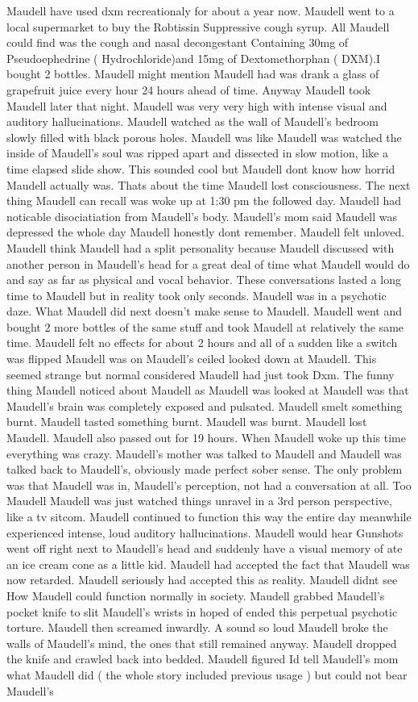 \documentclass[12pt]{book}
\begin{document}
Maudell have used dxm recreationaly for about a year now. Maudell went to a local supermarket to buy the Robtissin Suppressive cough syrup. All Maudell could find was the cough and nasal decongestant Containing 30mg of Pseudoephedrine ( Hydrochloride)and 15mg of Dextomethorphan ( DXM).I bought 2 bottles. Maudell might mention Maudell had was drank a glass of grapefruit juice every hour 24 hours ahead of time. Anyway Maudell took Maudell later that night. Maudell was very very high with intense visual and auditory hallucinations. Maudell watched as the wall of Maudell's bedroom slowly filled with black porous holes. Maudell was like Maudell was watched the inside of Maudell's soul was ripped apart and dissected in slow motion, like a time elapsed slide show. This sounded cool but Maudell dont know how horrid Maudell actually was. Thats about the time Maudell lost consciousness. The next thing Maudell can recall was woke up at 1:30 pm the followed day. Maudell had noticable disociatiation from Maudell's body. Maudell's mom said Maudell was depressed the whole day Maudell honestly dont remember. Maudell felt unloved. Maudell think Maudell had a split personality because Maudell discussed with another person in Maudell's head for a great deal of time what Maudell would do and say as far as physical and vocal behavior. These conversations lasted a long time to Maudell but in reality took only seconds. Maudell was in a psychotic daze. What Maudell did next doesn't make sense to Maudell. Maudell went and bought 2 more bottles of the same stuff and took Maudell at relatively the same time. Maudell felt no effects for about 2 hours and all of a sudden like a switch was flipped Maudell was on Maudell's ceiled looked down at Maudell. This seemed strange but normal considered Maudell had just took Dxm. The funny thing Maudell noticed about Maudell as Maudell was looked at Maudell was that Maudell's brain was completely exposed and pulsated. Maudell smelt something burnt. Maudell tasted something burnt. Maudell was burnt. Maudell lost Maudell. Maudell also passed out for 19 hours. When Maudell woke up this time everything was crazy. Maudell's mother was talked to Maudell and Maudell was talked back to Maudell's, obviously made perfect sober sense. The only problem was that Maudell was in, Maudell's perception, not had a conversation at all. Too Maudell Maudell was just watched things unravel in a 3rd person perspective, like a tv sitcom. Maudell continued to function this way the entire day meanwhile experienced intense, loud auditory hallucinations. Maudell would hear Gunshots went off right next to Maudell's head and suddenly have a visual memory of ate an ice cream cone as a little kid. Maudell had accepted the fact that Maudell was now retarded. Maudell seriously had accepted this as reality. Maudell didnt see How Maudell could function normally in society. Maudell grabbed Maudell's pocket knife to slit Maudell's wrists in hoped of ended this perpetual psychotic torture. Maudell then screamed inwardly. A sound so loud Maudell broke the walls of Maudell's mind, the ones that still remained anyway. Maudell dropped the knife and crawled back into bedded. Maudell figured Id tell Maudell's mom what Maudell did ( the whole story included previous usage ) but could not bear Maudell's 
\end{document}
